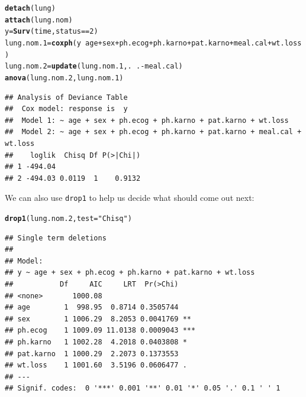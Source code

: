 \documentclass{article}\usepackage[]{graphicx}\usepackage[]{color}
\makeatletter
\newcommand{\hlnum}[1]{\textcolor[rgb]{0.686,0.059,0.569}{#1}}%
\newcommand{\hlstr}[1]{\textcolor[rgb]{0.192,0.494,0.8}{#1}}%
\newcommand{\hlopt}[1]{\textcolor[rgb]{0,0,0}{#1}}%
\newcommand{\hlstd}[1]{\textcolor[rgb]{0.345,0.345,0.345}{#1}}%
\newcommand{\hlkwb}[1]{\textcolor[rgb]{0.69,0.353,0.396}{#1}}%
\newcommand{\hlkwc}[1]{\textcolor[rgb]{0.333,0.667,0.333}{#1}}%
\newcommand{\hlkwd}[1]{\textcolor[rgb]{0.737,0.353,0.396}{\textbf{#1}}}%
\newenvironment{kframe}{%
 \def\at@end@of@kframe{}%
 \ifinner\ifhmode%
  \def\at@end@of@kframe{\end{minipage}}%
  \begin{minipage}{\columnwidth}%
 \fi\fi%
 \def\FrameCommand##1{\hskip\@totalleftmargin \hskip-\fboxsep
 \colorbox{shadecolor}{##1}\hskip-\fboxsep
     \hskip-\linewidth \hskip-\@totalleftmargin \hskip\columnwidth}%
 \MakeFramed {\advance\hsize-\width
   \@totalleftmargin\z@ \linewidth\hsize
   \@setminipage}}%
 {\par\unskip\endMakeFramed%
 \at@end@of@kframe}
\newenvironment{knitrout}{}{} %
\makeatother
\begin{document}
\begin{knitrout}
\color{fgcolor}\begin{kframe}
\begin{alltt}
\hlkwd{detach}\hlstd{(lung)}
\hlkwd{attach}\hlstd{(lung.nom)}
\hlstd{y}\hlkwb{=}\hlkwd{Surv}\hlstd{(time,status}\hlopt{==}\hlnum{2}\hlstd{)}
\hlstd{lung.nom.1}\hlkwb{=}\hlkwd{coxph}\hlstd{(y}\hlopt{~}\hlstd{age}\hlopt{+}\hlstd{sex}\hlopt{+}\hlstd{ph.ecog}\hlopt{+}\hlstd{ph.karno}\hlopt{+}\hlstd{pat.karno}\hlopt{+}\hlstd{meal.cal}\hlopt{+}\hlstd{wt.loss)}
\hlstd{lung.nom.2}\hlkwb{=}\hlkwd{update}\hlstd{(lung.nom.1,.}\hlopt{~}\hlstd{.}\hlopt{-}\hlstd{meal.cal)}
\hlkwd{anova}\hlstd{(lung.nom.2,lung.nom.1)}
\end{alltt}
\begin{verbatim}
## Analysis of Deviance Table
##  Cox model: response is  y
##  Model 1: ~ age + sex + ph.ecog + ph.karno + pat.karno + wt.loss
##  Model 2: ~ age + sex + ph.ecog + ph.karno + pat.karno + meal.cal + wt.loss
##    loglik  Chisq Df P(>|Chi|)
## 1 -494.04                    
## 2 -494.03 0.0119  1    0.9132
\end{verbatim}
\end{kframe}
\end{knitrout}

We can also use \texttt{drop1} to help us decide what should come out next:

\begin{knitrout}
\color{fgcolor}\begin{kframe}
\begin{alltt}
\hlkwd{drop1}\hlstd{(lung.nom.2,}\hlkwc{test}\hlstd{=}\hlstr{"Chisq"}\hlstd{)}
\end{alltt}
\begin{verbatim}
## Single term deletions
## 
## Model:
## y ~ age + sex + ph.ecog + ph.karno + pat.karno + wt.loss
##           Df     AIC     LRT  Pr(>Chi)    
## <none>       1000.08                      
## age        1  998.95  0.8714 0.3505744    
## sex        1 1006.29  8.2053 0.0041769 ** 
## ph.ecog    1 1009.09 11.0138 0.0009043 ***
## ph.karno   1 1002.28  4.2018 0.0403808 *  
## pat.karno  1 1000.29  2.2073 0.1373553    
## wt.loss    1 1001.60  3.5196 0.0606477 .  
## ---
## Signif. codes:  0 '***' 0.001 '**' 0.01 '*' 0.05 '.' 0.1 ' ' 1
\end{verbatim}
\end{kframe}
\end{knitrout}
\end{document}
